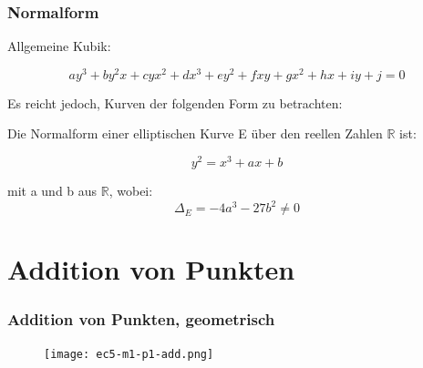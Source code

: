 \documentclass{beamer}
\newcommand{\R}{\mathbb{R}}
\begin{document}
\begin{frame}
  \frametitle{Normalform}
  Allgemeine Kubik:

  \begin{equation*}
    a y^3 + b y^2 x + c y x^2 + d x^3 + e y^2 + f x y + g x^2 +
    h x + i y + j = 0
  \end{equation*}

  Es reicht jedoch, Kurven der folgenden Form zu betrachten:

  \pause
  \begin{definition}
    Die Normalform einer elliptischen Kurve E über den reellen Zahlen
    $\R$ ist:

    \begin{equation}
      y^2 = x^3 + ax + b
      \label{eq:weier}
    \end{equation}

    mit a und b aus $\R$, wobei:
    \begin{equation}
      \Delta_E = -4a^3 - 27b^2 \ne 0
    \end{equation}
  \end{definition}
\end{frame}


\section{Addition von Punkten}

\begin{frame}
  \frametitle{Addition von Punkten, geometrisch}
  \begin{figure}
    \texttt{[image: ec5-m1-p1-add.png]}
  \end{figure}
\end{frame}
\end{document}

